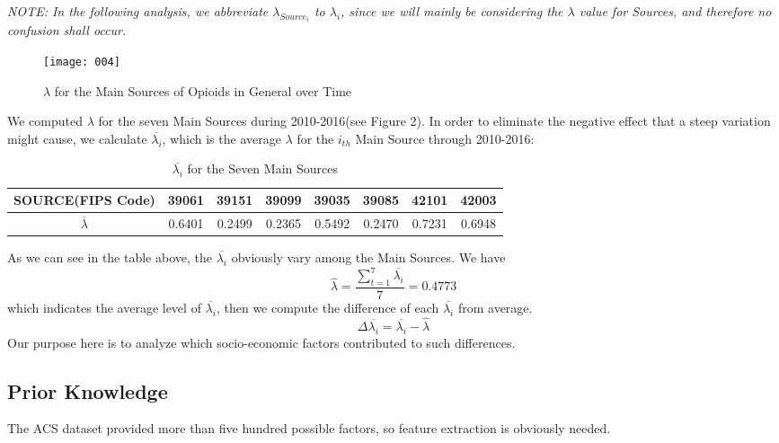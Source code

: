 \textit{
NOTE: In the following analysis, we abbreviate $\lambda_{Source_i}$ to $\lambda_i$, since we will mainly be considering the $\lambda$ value for Sources, and therefore no confusion shall occur. 
}

\begin{figure}[H]
	\centering
	\texttt{[image: 004]}
	\caption{$\lambda$ for the Main Sources of Opioids in General over Time}
\end{figure}

We computed $\lambda$ for the seven Main Sources during 2010-2016(see Figure 2). In order to eliminate the negative effect that a steep variation might cause, we calculate $\overline{\lambda_i}$, which is the average $\lambda$ for the $i_{th}$ Main Source through 2010-2016:

\begin{table}[H]
	\centering
\begin{tabular}{|c|c|c|c|c|c|c|c|}
	\hline
	\rowcolor[HTML]{656565} 
	{\color[HTML]{FFFFFF} \textbf{SOURCE(FIPS Code)}} &{\color[HTML]{FFFFFF} \textbf{39061}} & {\color[HTML]{FFFFFF} \textbf{39151}} & {\color[HTML]{FFFFFF} \textbf{39099}}  & {\color[HTML]{FFFFFF} \textbf{39035}} & {\color[HTML]{FFFFFF} \textbf{39085}} & {\color[HTML]{FFFFFF} \textbf{42101}}  & {\color[HTML]{FFFFFF} \textbf{42003}}\\ \hline
	$\overline{\lambda}$ & 0.6401 & 0.2499 & 0.2365 & 0.5492 & 0.2470 & 0.7231 & 0.6948 \\ \hline
\end{tabular}
\centering
\caption{$\overline{\lambda_i}$ for the Seven Main Sources}
\end{table}

As we can see in the table above, the $\overline{\lambda_i}$ obviously vary among the Main Sources. We have
\begin{equation}
\hat{\lambda}=\frac{\sum_{t=1}^{7}\overline{\lambda_i}}{7}=0.4773
\end{equation}
which indicates the average level of $\overline{\lambda_i}$, then we compute the difference of each $\overline{\lambda_i}$ from average.
\begin{equation}
\Delta \overline{\lambda_i} = \overline{\lambda_i} - \hat{\lambda}
\end{equation}
Our purpose here is to analyze which socio-economic factors contributed to such differences.

\subsection{Prior Knowledge}
The ACS dataset provided more than five hundred possible factors, so feature extraction is obviously needed. 

